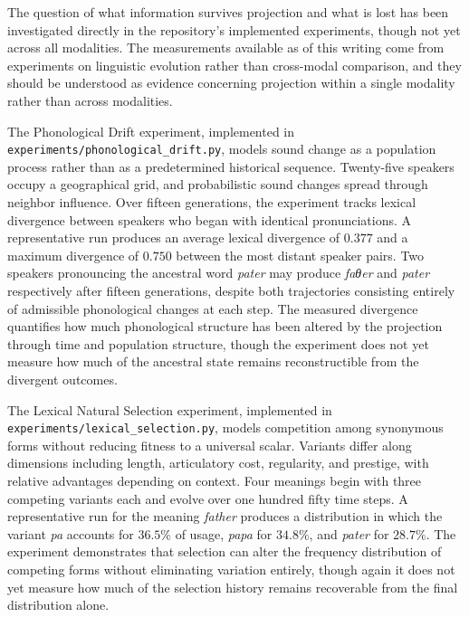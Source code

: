 The question of what information survives projection and what is lost has been investigated directly in the repository's implemented experiments, though not yet across all modalities. The measurements available as of this writing come from experiments on linguistic evolution rather than cross-modal comparison, and they should be understood as evidence concerning projection within a single modality rather than across modalities.

The Phonological Drift experiment, implemented in \texttt{experiments/phonological\_drift.py}, models sound change as a population process rather than as a predetermined historical sequence. Twenty-five speakers occupy a geographical grid, and probabilistic sound changes spread through neighbor influence. Over fifteen generations, the experiment tracks lexical divergence between speakers who began with identical pronunciations. A representative run produces an average lexical divergence of $0.377$ and a maximum divergence of $0.750$ between the most distant speaker pairs. Two speakers pronouncing the ancestral word \textit{pater} may produce \textit{faθer} and \textit{pater} respectively after fifteen generations, despite both trajectories consisting entirely of admissible phonological changes at each step. The measured divergence quantifies how much phonological structure has been altered by the projection through time and population structure, though the experiment does not yet measure how much of the ancestral state remains reconstructible from the divergent outcomes.

The Lexical Natural Selection experiment, implemented in \texttt{experiments/lexical\_selection.py}, models competition among synonymous forms without reducing fitness to a universal scalar. Variants differ along dimensions including length, articulatory cost, regularity, and prestige, with relative advantages depending on context. Four meanings begin with three competing variants each and evolve over one hundred fifty time steps. A representative run for the meaning \textit{father} produces a distribution in which the variant \textit{pa} accounts for $36.5\%$ of usage, \textit{papa} for $34.8\%$, and \textit{pater} for $28.7\%$. The experiment demonstrates that selection can alter the frequency distribution of competing forms without eliminating variation entirely, though again it does not yet measure how much of the selection history remains recoverable from the final distribution alone.

